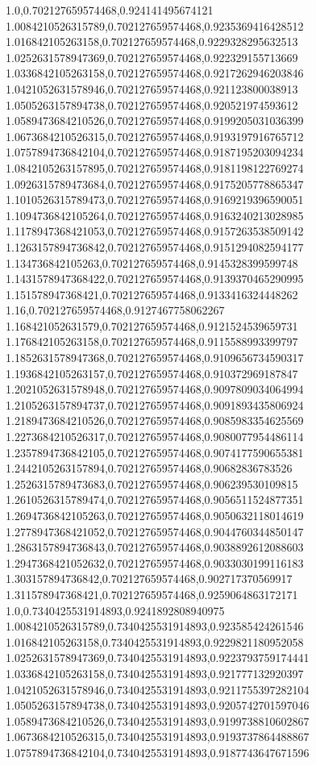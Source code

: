 1.0,0.702127659574468,0.924141495674121
1.0084210526315789,0.702127659574468,0.9235369416428512
1.016842105263158,0.702127659574468,0.9229328295632513
1.0252631578947369,0.702127659574468,0.922329155713669
1.0336842105263158,0.702127659574468,0.9217262946203846
1.0421052631578946,0.702127659574468,0.921123800038913
1.0505263157894738,0.702127659574468,0.920521974593612
1.0589473684210526,0.702127659574468,0.9199205031036399
1.0673684210526315,0.702127659574468,0.9193197916765712
1.0757894736842104,0.702127659574468,0.9187195203094234
1.0842105263157895,0.702127659574468,0.9181198122769274
1.0926315789473684,0.702127659574468,0.9175205778865347
1.1010526315789473,0.702127659574468,0.9169219396590051
1.1094736842105264,0.702127659574468,0.9163240213028985
1.1178947368421053,0.702127659574468,0.9157263538509142
1.1263157894736842,0.702127659574468,0.9151294082594177
1.134736842105263,0.702127659574468,0.9145328399599748
1.1431578947368422,0.702127659574468,0.9139370465290995
1.151578947368421,0.702127659574468,0.9133416324448262
1.16,0.702127659574468,0.9127467758062267
1.168421052631579,0.702127659574468,0.9121524539659731
1.176842105263158,0.702127659574468,0.9115588993399797
1.1852631578947368,0.702127659574468,0.9109656734590317
1.1936842105263157,0.702127659574468,0.910372969187847
1.2021052631578948,0.702127659574468,0.9097809034064994
1.2105263157894737,0.702127659574468,0.9091893435806924
1.2189473684210526,0.702127659574468,0.9085983354625569
1.2273684210526317,0.702127659574468,0.9080077954486114
1.2357894736842105,0.702127659574468,0.9074177590655381
1.2442105263157894,0.702127659574468,0.90682836783526
1.2526315789473683,0.702127659574468,0.906239530109815
1.2610526315789474,0.702127659574468,0.9056511524877351
1.2694736842105263,0.702127659574468,0.9050632118014619
1.2778947368421052,0.702127659574468,0.9044760344850147
1.2863157894736843,0.702127659574468,0.9038892612088603
1.2947368421052632,0.702127659574468,0.9033030199116183
1.303157894736842,0.702127659574468,0.902717370569917
1.311578947368421,0.702127659574468,0.9259064863172171
1.0,0.7340425531914893,0.9241892808940975
1.0084210526315789,0.7340425531914893,0.923585424261546
1.016842105263158,0.7340425531914893,0.9229821180952058
1.0252631578947369,0.7340425531914893,0.9223793759174441
1.0336842105263158,0.7340425531914893,0.921777132920397
1.0421052631578946,0.7340425531914893,0.9211755397282104
1.0505263157894738,0.7340425531914893,0.9205742701597046
1.0589473684210526,0.7340425531914893,0.9199738810602867
1.0673684210526315,0.7340425531914893,0.9193737864488867
1.0757894736842104,0.7340425531914893,0.9187743647671596
